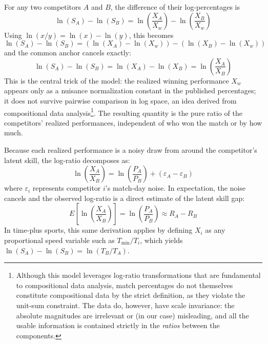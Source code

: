 \documentclass[12pt]{article}
\newcommand{\xwin}{X_w}
\newcommand{\tmin}{T_{\mathrm{min}}}
\begin{document}
	For any two competitors $A$ and $B$, the difference of their log-percentages is
	\begin{equation}
		\ln(S_A) - \ln(S_B) = \ln\!\left(\frac{X_A}{\xwin}\right) - \ln\!\left(\frac{X_B}{\xwin}\right)
	\end{equation}
	Using $\ln(x/y) = \ln(x) - \ln(y)$, this becomes
	\begin{equation}
		\ln(S_A) - \ln(S_B) = (\ln(X_A) - \ln(\xwin)) - (\ln(X_B) - \ln(\xwin))
	\end{equation}
	and the common anchor cancels exactly:
	\begin{equation}
		\ln(S_A) - \ln(S_B) = \ln(X_A) - \ln(X_B) = \ln\!\left(\frac{X_A}{X_B}\right)
	\end{equation}
	This is the central trick of the model: the realized winning performance $\xwin$ appears only as a nuisance normalization constant in the published percentages; it does not survive pairwise comparison in log space, an idea derived from compositional data analysis\cite{aitchison1982compositional}\footnote{Although this model leverages log-ratio transformations that are fundamental to compositional data analysis, match percentages do not themselves constitute compositional data by the strict definition, as they violate the unit-sum constraint. The data do, however, have scale invariance: the absolute magnitudes are irrelevant or (in our case) misleading, and all the usable information is contained strictly in the \emph{ratios} between the components.}. The resulting quantity is the pure ratio of the competitors' realized performances, independent of who won the match or by how much.

	Because each realized performance is a noisy draw from around the competitor's latent skill, the log-ratio decomposes as:
	\begin{equation}
		\ln\!\left(\frac{X_A}{X_B}\right) = \ln\!\left(\frac{P_A}{P_B}\right) + (\varepsilon_A - \varepsilon_B)
	\end{equation}
	where $\varepsilon_i$ represents competitor $i$'s match-day noise. In expectation, the noise cancels and the observed log-ratio is a direct estimate of the latent skill gap:
	\begin{equation}
		E\!\left[\ln\!\left(\frac{X_A}{X_B}\right)\right] = \ln\!\left(\frac{P_A}{P_B}\right) \approx R_A - R_B
	\end{equation}
	In time-plus sports, this same derivation applies by defining $X_i$ as any proportional speed variable such as $\tmin/T_i$, which yields $\ln(S_A) - \ln(S_B) = \ln(T_B/T_A)$.
\end{document}
